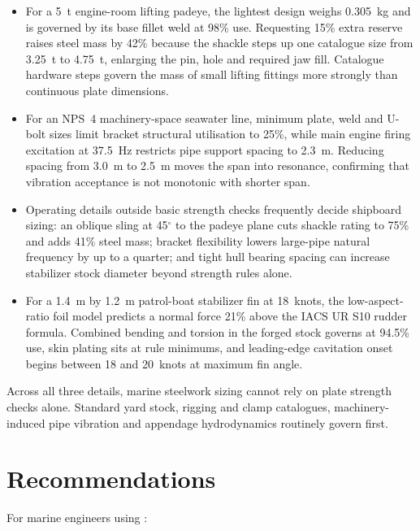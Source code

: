 \begin{itemize}
    \item For a 5~t engine-room lifting padeye, the lightest design weighs
    0.305~kg and is governed by its base fillet weld at 98\% use. Requesting
    15\% extra reserve raises steel mass by 42\% because the shackle steps up
    one catalogue size from 3.25~t to 4.75~t, enlarging the pin, hole and
    required jaw fill. Catalogue hardware steps govern the mass of small
    lifting fittings more strongly than continuous plate dimensions.
    \item For an NPS~4 machinery-space seawater line, minimum plate, weld and
    U-bolt sizes limit bracket structural utilisation to 25\%, while main
    engine firing excitation at 37.5~Hz restricts pipe support spacing to
    2.3~m. Reducing spacing from 3.0~m to 2.5~m moves the span into resonance,
    confirming that vibration acceptance is not monotonic with shorter span.
    \item Operating details outside basic strength checks frequently decide
    shipboard sizing: an oblique sling at 45$^\circ$ to the padeye plane cuts
    shackle rating to 75\% and adds 41\% steel mass; bracket flexibility lowers
    large-pipe natural frequency by up to a quarter; and tight hull bearing
    spacing can increase stabilizer stock diameter beyond strength rules alone.
    \item For a 1.4~m by 1.2~m patrol-boat stabilizer fin at 18~knots, the
    low-aspect-ratio foil model predicts a normal force 21\% above the IACS
    UR S10 rudder formula. Combined bending and torsion in the forged stock
    governs at 94.5\% use, skin plating sits at rule minimums, and
    leading-edge cavitation onset begins between 18 and 20~knots at maximum
    fin angle.
\end{itemize}

Across all three details, marine steelwork sizing cannot rely on plate
strength checks alone. Standard yard stock, rigging and clamp catalogues,
machinery-induced pipe vibration and appendage hydrodynamics routinely govern
first.

\section{Recommendations}
\label{sec:recommendations}

For marine engineers using \NEMO{}:


